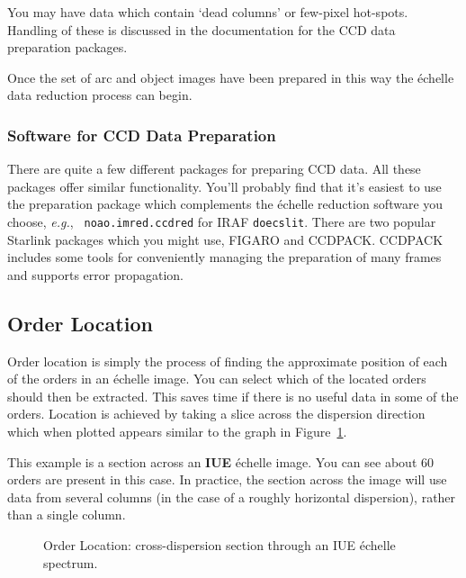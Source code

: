 \documentclass[twoside,11pt]{article}
\newcommand{\htmlref}[2]{#1}
\newcommand{\xref}[3]{#1}
\newcommand{\xlabel}[1]{}
\newcommand{\sgspec}[2]{#1}
\newcommand{\sgspec}[2]{#2}
\begin{document}
You may have data which contain `dead columns' or few-pixel hot-spots.
Handling of these is discussed in the documentation for the CCD data
preparation packages.

Once the set of arc and object images have been prepared in this way the
\'{e}chelle data reduction process can begin.


\subsubsection{Software for CCD Data Preparation}

There are quite a few different packages for preparing CCD data. All
these packages offer similar functionality.  You'll probably find that
it's easiest to use the preparation package which complements the
\'{e}chelle reduction software you choose, {\em e.g.}, {\tt
noao.imred.ccdred} for IRAF {\tt doecslit}\@.  There are two popular
Starlink packages which you might use,
\xref{FIGARO}{sun86}{} and \xref{CCDPACK}{sun139}{}\@.  CCDPACK includes
some tools for conveniently managing the preparation of many frames and
supports error propagation.


\subsection{\label{se_order_location}\xlabel{order_location}Order Location}

Order location is simply the process of finding the approximate position
of each of the orders in an \'{e}chelle image.  You can select which of the
located orders should then be extracted.  This saves time if there is no
useful data in some of the orders.  Location is achieved by taking a
slice across the dispersion direction which when plotted appears similar
to the graph \sgspec{in Figure~\ref{fi_scan_plot}\@.}{below.}

This example is a section across an \htmlref{{\bf IUE}}{gl_iue} \'{echelle}
image.
You can see about 60 orders are present in this case.
In practice, the section across the image will use data from several
columns (in the case of a roughly horizontal dispersion), rather than
a single column.

\begin{figure}
\begin{center}
\sgspec{\leavevmode\epsfysize=105mm\epsfbox{sg9_01.eps}}
{\leavevmode\epsfysize=136mm}

\parbox{140mm}{
\caption{Order Location: cross-dispersion section through an IUE
         \'{e}chelle spectrum.}
\label{fi_scan_plot}
}
\end{center}
\end{figure}
\end{document}
